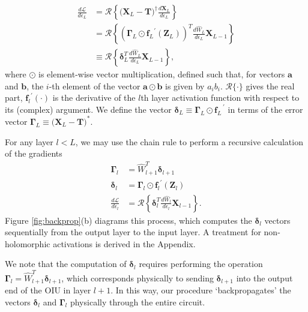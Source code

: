 \begin{align}
\frac{d\mathcal{L}}{d\epsilon_L} &= \mathcal{R}\left\{\big(\mathbf{X}_L - \mathbf{T} \big)^\dagger \frac{d\mathbf{X}_L}{d\epsilon_L} \right\}\\
    &= \mathcal{R}\left\{ \left(  \bm{\Gamma}_L \odot {\mathbf{f}_L}^{'}(\mathbf{Z}_{L}) \right)^T \frac{d \hat{W}_L}{d\epsilon_L}\mathbf{X}_{L-1} \right\}\\ 
    &\equiv \mathcal{R}\left\{ \boldsymbol{\delta}_L^T \frac{d \hat{W}_L}{d\epsilon_L} \mathbf{X}_{L-1} \right\},
\label{eq:backprop_L}
\end{align}
where $\odot$ is element-wise vector multiplication, defined such that, for vectors $\mathbf{a}$ and $\mathbf{b}$, the $i$-th element of the vector $\mathbf{a} \odot \mathbf{b}$ is given by $a_i b_i$. $\mathcal{R}\{\cdot\}$ gives the real part, ${\mathbf{f}_l}^{'}(\cdot)$ is the derivative of the $l$th layer activation function with respect to its (complex) argument.  We define the vector $\bm{\delta}_L \equiv \bm{\Gamma}_L \odot {\mathbf{f}_L}^{\,'}$ in terms of the error vector $\bm{\Gamma}_L \equiv \big(\mathbf{X}_L - \mathbf{T} \big)^*$.

For any layer $l < L$, we may use the chain rule to perform a recursive calculation of the gradients
\begin{align}
\bm{\Gamma}_l &= \hat{W}^T_{l+1} \bm{\delta}_{l+1} \label{eq:backprop_general_Gamma}
\\
\bm{\delta}_l &= \bm{\Gamma}_l \odot {\mathbf{f}_l}^{'}(\mathbf{Z}_{l}) \label{eq:backprop_general2}
\\
\frac{d\mathcal{L}}{d\epsilon_l} &= \mathcal{R}\left\{ \bm{\delta}_l^T \frac{d \hat{W}_l}{d\epsilon_l} \mathbf{X}_{l-1} \right\}.
\label{eq:backprop_general}
\end{align}
Figure \ref{fig:backprop}(b) diagrams this process, which computes the $\bm{\delta}_l$ vectors sequentially from the output layer to the input layer.  A treatment for non-holomorphic activations is derived in the Appendix.

We note that the computation of $\bm{\delta}_l$ requires performing the operation $\bm{\Gamma}_l = \hat{W}^T_{l+1} \bm{\delta}_{l+1}$, which corresponds physically to sending $\bm{\delta}_{l+1}$ into the output end of the OIU in layer $l+1$.  In this way, our procedure `backpropagates' the vectors $\bm{\delta}_l$ and $\bm{\Gamma}_l$ physically through the entire circuit.


